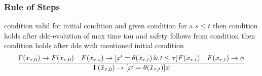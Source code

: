 \documentclass[10pt]{article}
\begin{document}
        \begin{calculus}
        \end{calculus}

        \subsubsection{Rule of Steps}
            \label{sec:rule-of-steps}

            condition valid for initial condition and given condition for a $s\leq t$ then condition holds after dde-evolution of max time tau and safety follows from condition then condition holds after dde with mentioned initial condition
            \begin{equation}
            \frac{\Gamma(\bar{x}_{\tau,0})\rightarrow F(\bar{x}_{\tau,0})\quad F(\bar{x}_{\tau,s})\rightarrow [x'=\theta(\bar{x}_{\tau,t})\,\&\,t\leq\tau]F(\bar{x}_{\tau,t}) \quad F(\bar{x}_{\tau,t})\rightarrow\phi}{\Gamma(\bar{x}_{\tau,0}) \rightarrow [x'=\theta(\bar{x}_{\tau,t})]\phi}
            \end{equation}
\end{document}
